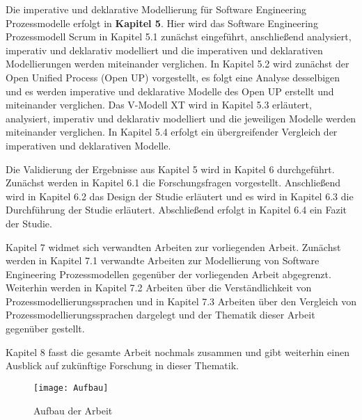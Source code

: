 Die imperative und deklarative Modellierung für Software Engineering Prozessmodelle erfolgt in \textbf{Kapitel 5}. Hier wird das Software Engineering Prozessmodell Scrum in Kapitel 5.1 zunächst eingeführt, anschließend analysiert, imperativ und deklarativ modelliert und die imperativen und deklarativen Modellierungen werden miteinander verglichen. In Kapitel 5.2 wird zunächst der Open Unified Process (Open UP) vorgestellt, es folgt eine Analyse desselbigen und es werden imperative und deklarative Modelle des Open UP erstellt und miteinander verglichen. Das V-Modell XT wird in Kapitel 5.3 erläutert, analysiert, imperativ und deklarativ modelliert und die jeweiligen Modelle werden miteinander verglichen. In Kapitel 5.4 erfolgt ein übergreifender Vergleich der imperativen und deklarativen Modelle.\newline

Die Validierung der Ergebnisse aus Kapitel 5 wird in Kapitel 6 durchgeführt. Zunächst werden in Kapitel 6.1 die Forschungsfragen vorgestellt. Anschließend wird in Kapitel 6.2 das Design der Studie erläutert und es wird in Kapitel 6.3 die Durchführung der Studie erläutert. Abschließend erfolgt in Kapitel 6.4 ein Fazit der Studie.  \newline

Kapitel 7 widmet sich verwandten Arbeiten zur vorliegenden Arbeit. Zunächst werden in Kapitel 7.1 verwandte Arbeiten zur Modellierung von Software Engineering Prozessmodellen gegenüber der vorliegenden Arbeit abgegrenzt. Weiterhin werden in Kapitel 7.2 Arbeiten über die Verständlichkeit von Prozessmodellierungssprachen und in Kapitel 7.3 Arbeiten über den Vergleich von Prozessmodellierungssprachen dargelegt und der Thematik dieser Arbeit gegenüber gestellt.\newline

Kapitel 8 fasst die gesamte Arbeit nochmals zusammen und gibt weiterhin einen Ausblick auf zukünftige Forschung in dieser Thematik.

\begin{figure}[htp]
\begin{center}
  \texttt{[image: Aufbau]} %
  \caption{Aufbau der Arbeit}
  \label{fig:Aufbau}
\end{center}
\end{figure}

